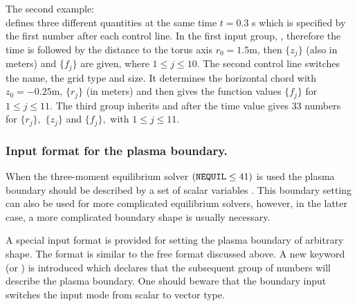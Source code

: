 The second example:
\\
\dl{*************************************************************************}
defines three different quantities at the same time $t=$0.3 s 
which is specified by the first number after each control line.
In the first input group, , therefore the time is
followed by the distance to the torus axis $r_0=1.5$m, then $\{z_j\}$
(also in meters) and $\{f_j\}$ are given, where $1\leq j\leq 10.$
The second control line switches the name, the grid type and size.  
It determines the horizontal chord with $z_0=-0.25$m, $\{r_j\}$ (in meters) 
and then gives the function values $\{f_j\}$
for $1\leq j\leq 11.$
The third group inherits  and after the time value gives
33 numbers for $\{r_j\},$ $\{z_j\}$ and $\{f_j\},$ with $1\leq j\leq 11.$

\subsubsection{Input format for the plasma boundary.}
When the three-moment equilibrium solver $({\tt NEQUIL}\leq41)$ is
used the plasma boundary should be described by a set of scalar
variables .
This boundary setting can also be used for more complicated
equilibrium solvers, however, in the latter case, a more complicated
boundary shape is usually necessary.

A special input format is provided for setting the plasma boundary of
arbitrary shape.
The format is similar to the free format discussed above.
A new keyword  (or ) is introduced which declares that
the subsequent group of numbers will describe the plasma boundary.
One should beware that the boundary input switches the input mode from
scalar to vector type.

